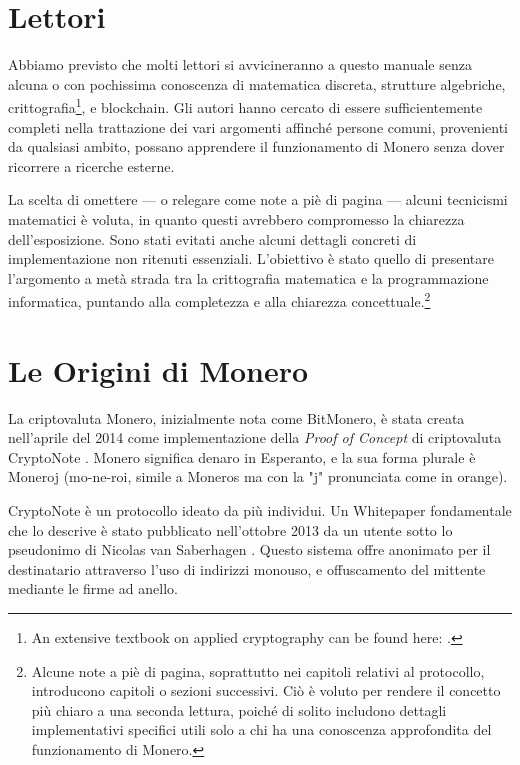 \section{Lettori}

Abbiamo previsto che molti lettori si avvicineranno a questo manuale senza alcuna o con pochissima conoscenza di matematica discreta, strutture algebriche, crittografia\footnote{An extensive textbook on applied cryptography can be found here: \cite{applied-cryptography-textbook}.}, e blockchain. Gli autori hanno cercato di essere sufficientemente completi nella trattazione dei vari argomenti affinché persone comuni, provenienti da qualsiasi ambito, possano apprendere il funzionamento di Monero senza dover ricorrere a ricerche esterne.

La scelta di omettere — o relegare come note a piè di pagina — alcuni tecnicismi matematici è voluta, in quanto questi avrebbero compromesso la chiarezza dell’esposizione. Sono stati evitati anche alcuni dettagli concreti di implementazione non ritenuti essenziali. L'obiettivo è stato quello di presentare l’argomento a metà strada tra la crittografia matematica e la programmazione informatica, puntando alla completezza e alla chiarezza concettuale.\footnote{Alcune note a piè di pagina, soprattutto nei capitoli relativi al protocollo, introducono capitoli o sezioni successivi. Ciò è voluto per rendere il concetto più chiaro a una seconda lettura, poiché di solito includono dettagli implementativi specifici utili solo a chi ha una conoscenza approfondita del funzionamento di Monero.}



\section{Le Origini di Monero}

La criptovaluta Monero, inizialmente nota come BitMonero, è stata creata nell’aprile del 2014 come implementazione della \emph{Proof of Concept} di criptovaluta CryptoNote \cite{bitmonero-launched}. Monero significa denaro in Esperanto, e la sua forma plurale è Moneroj (mo-ne-roi, simile a Moneros ma con la "j" pronunciata come in orange).

CryptoNote è un protocollo ideato da più individui. Un Whitepaper fondamentale che lo descrive è stato pubblicato nell’ottobre 2013 da un utente sotto lo pseudonimo di Nicolas van Saberhagen \cite{cryptoNoteWhitePaper}. Questo sistema offre anonimato per il destinatario attraverso l’uso di indirizzi monouso, e offuscamento del mittente mediante le firme ad anello.

